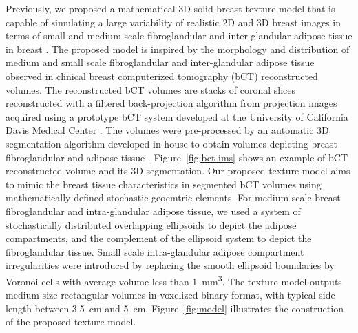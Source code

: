 \documentclass[journal]{IEEEtran}
\begin{document}
Previously, we proposed a mathematical 3D solid breast texture model
that is capable of simulating a large variability of realistic 2D and
3D breast images in terms of small and medium scale fibroglandular and
inter-glandular adipose tissue in breast \cite{li2016novel}. The
proposed model is inspired by the morphology and distribution of
medium and small scale fibroglandular and inter-glandular adipose
tissue observed in clinical breast computerized tomography (bCT)
reconstructed volumes. The reconstructed bCT volumes are stacks of
coronal slices reconstructed with a filtered back-projection algorithm
from projection images acquired using a prototype bCT system developed
at the University of California Davis Medical Center
\cite{lindfors2008dedicated}. The volumes were pre-processed by an
automatic 3D segmentation algorithm developed in-house to obtain
volumes depicting breast fibroglandular and adipose tissue
\cite{thomas2015segmentation}. Figure~\ref{fig:bct-ims} shows an
example of bCT reconstructed volume and its 3D segmentation. Our
proposed texture model aims to mimic the breast tissue characteristics
in segmented bCT volumes using mathematically defined stochastic
geoemtric elements.  For medium scale breast fibroglandular and
intra-glandular adipose tissue, we used a system of stochastically
distributed overlapping ellipsoids to depict the adipose compartments,
and the complement of the ellipsoid system to depict the
fibroglandular tissue. Small scale intra-glandular adipose compartment
irregularities were introduced by replacing the smooth ellipsoid
boundaries by Voronoi cells with average volume less than
\SI{1}{\mm\cubed}. The texture model outputs medium size rectangular
volumes in voxelized binary format, with typical side length between
\SI{3.5}{\cm} and \SI{5}{\cm}. Figure~\ref{fig:model} illustrates the
construction of the proposed texture model.
\end{document}
